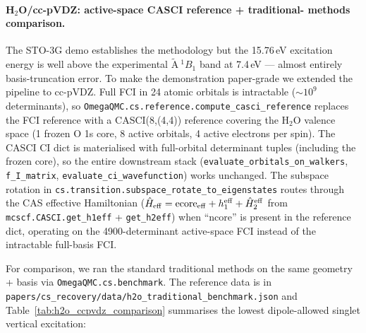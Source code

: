 \documentclass[journal=jctcce,manuscript=suppinfo,layout=traditional]{achemso}
\begin{document}
\paragraph{H$_2$O/cc-pVDZ: active-space CASCI reference + traditional-
methods comparison.}
The STO-3G demo establishes the methodology but the 15.76\,eV
excitation energy is well above the experimental
$\tilde{\mathrm{A}}\ ^1B_1$ band at 7.4\,eV --- almost entirely
basis-truncation error. To make the demonstration paper-grade we
extended the pipeline to cc-pVDZ. Full FCI in 24 atomic orbitals
is intractable ($\sim 10^9$ determinants), so
\texttt{OmegaQMC.cs.reference.compute\_casci\_reference} replaces
the FCI reference with a CASCI(8,(4,4)) reference covering the H$_2$O
valence space (1 frozen O 1s core, 8 active orbitals, 4 active
electrons per spin). The CASCI CI dict is materialised with
full-orbital determinant tuples (including the frozen core), so
the entire downstream stack (\texttt{evaluate\_orbitals\_on\_walkers},
\texttt{f\_I\_matrix}, \texttt{evaluate\_ci\_wavefunction}) works
unchanged. The subspace rotation in
\texttt{cs.transition.subspace\_rotate\_to\_eigenstates} routes
through the CAS effective Hamiltonian
($\hat H_{\rm eff} = \mathrm{ecore}_{\rm eff} + h_1^{\rm eff} +
\hat H_2^{\rm eff}$ from \texttt{mcscf.CASCI.get\_h1eff} +
\texttt{get\_h2eff}) when ``ncore'' is present in the reference dict,
operating on the 4900-determinant active-space FCI instead of the
intractable full-basis FCI.

For comparison, we ran the standard traditional methods on the same
geometry + basis via \texttt{OmegaQMC.cs.benchmark}. The reference
data is in \texttt{papers/cs\_recovery/data/h2o\_traditional\_benchmark.json}
and Table~\ref{tab:h2o_ccpvdz_comparison} summarises the lowest
dipole-allowed singlet vertical excitation:
\end{document}
